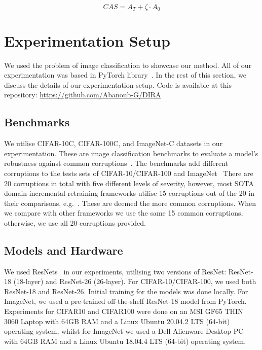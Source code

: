 \begin{equation}
CAS = A_T + \zeta \cdot A_0  
\label{eq:CAS_score}
\end{equation}

\section{Experimentation Setup}\label{sec:experimentation}
We used the problem of image classification to showcase our method. All of our experimentation was based in PyTorch library~\cite{paszke2019pytorch}. In the rest of this section, we discuss the details of our experimentation setup. Code is available at this repository: \url{https://github.com/Abanoub-G/DIRA}


\subsection{Benchmarks}
We utilise CIFAR-10C, CIFAR-100C, and ImageNet-C datasets in our experimentation. These are image classification benchmarks to evaluate a model's robustness against common corruptions~\cite{hendrycks2019benchmarking}.
%
The benchmarks add different corruptions to the tests sets of CIFAR-10/CIFAR-100\cite{krizhevsky2009learning} and ImageNet~\cite{deng2009imagenet}
%
There are 20 corruptions in total with five different levels of severity, however, most SOTA domain-incremental retraining frameworks utilise 15 corruptions out of the 20 in their comparisons, e.g.~\cite{mirza2022norm, sun2020test}. 
%
These are deemed the more common corruptions. When we compare with other frameworks we use the same 15 common corruptions, otherwise, we use all 20 corruptions provided.

\subsection{Models and Hardware}
We used ResNets~\cite{he2016deep} in our experiments, utilising two versions of ResNet: ResNet-18 (18-layer) and ResNet-26 (26-layer). For CIFAR-10/CIFAR-100, we used both ResNet-18 and ResNet-26. Initial training for the models was done locally. For ImageNet, we used a pre-trained off-the-shelf ResNet-18 model from PyTorch. 
%
Experiments for CIFAR10 and CIFAR100 were done on an MSI GF65 THIN 3060 Laptop with 64GB RAM and a Linux Ubuntu 20.04.2 LTS (64-bit) operating system, whilst for ImageNet we used a Dell Alienware Desktop PC with 64GB RAM and a Linux Ubuntu 18.04.4 LTS (64-bit) operating system.

